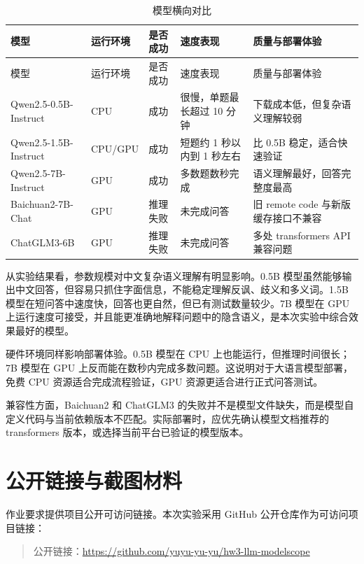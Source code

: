 \documentclass[UTF8,a4paper,fontset=none,zihao=-4]{ctexart}
\begin{document}
\begin{longtable}{p{3.4cm}p{1.8cm}p{2.0cm}p{2.6cm}p{3.2cm}}
  \caption{模型横向对比} \label{tab:compare}\\
  \toprule
  模型 & 运行环境 & 是否成功 & 速度表现 & 质量与部署体验 \\
  \midrule
  \endfirsthead
  \toprule
  模型 & 运行环境 & 是否成功 & 速度表现 & 质量与部署体验 \\
  \midrule
  \endhead
  Qwen2.5-0.5B-Instruct & CPU & 成功 & 很慢，单题最长超过 10 分钟 & 下载成本低，但复杂语义理解较弱 \\
  Qwen2.5-1.5B-Instruct & CPU/GPU & 成功 & 短题约 1 秒以内到 1 秒左右 & 比 0.5B 稳定，适合快速验证 \\
  Qwen2.5-7B-Instruct & GPU & 成功 & 多数题数秒完成 & 语义理解最好，回答完整度最高 \\
  Baichuan2-7B-Chat & GPU & 推理失败 & 未完成问答 & 旧 remote code 与新版缓存接口不兼容 \\
  ChatGLM3-6B & GPU & 推理失败 & 未完成问答 & 多处 transformers API 兼容问题 \\
  \bottomrule
\end{longtable}

从实验结果看，参数规模对中文复杂语义理解有明显影响。0.5B 模型虽然能够输出中文回答，但容易只抓住字面信息，不能稳定理解反讽、歧义和多义词。1.5B 模型在短问答中速度快，回答也更自然，但已有测试数量较少。7B 模型在 GPU 上运行速度可接受，并且能更准确地解释问题中的隐含语义，是本次实验中综合效果最好的模型。

硬件环境同样影响部署体验。0.5B 模型在 CPU 上也能运行，但推理时间很长；7B 模型在 GPU 上反而能在数秒内完成多数问题。这说明对于大语言模型部署，免费 CPU 资源适合完成流程验证，GPU 资源更适合进行正式问答测试。

兼容性方面，Baichuan2 和 ChatGLM3 的失败并不是模型文件缺失，而是模型自定义代码与当前依赖版本不匹配。实际部署时，应优先确认模型文档推荐的 transformers 版本，或选择当前平台已验证的模型版本。

\section{公开链接与截图材料}

作业要求提供项目公开可访问链接。本次实验采用 GitHub 公开仓库作为可访问项目链接：

\begin{quote}
公开链接：\url{https://github.com/yuyu-yu-yu/hw3-llm-modelscope}
\end{quote}
\end{document}
